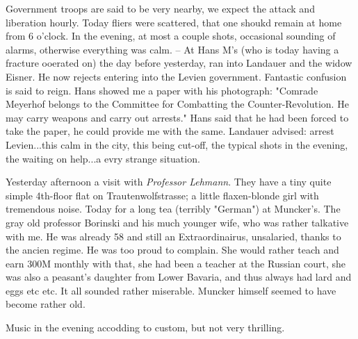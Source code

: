 
Government troops are said to be very nearby, we expect the attack and liberation hourly. Today fliers were scattered, that one shoukd remain at home from 6 o'clock. In the evening, at most a couple shots, occasional sounding of alarms, otherwise everything was calm. -- At Hans M's (who is today having a fracture ooerated on) the day before yesterday, ran into Landauer and the widow Eisner. He now rejects entering into the Levien government. Fantastic confusion is said to reign. Hans showed me a paper with his photograph: "Comrade Meyerhof belongs to the Committee for Combatting the Counter-Revolution. He may carry weapons and carry out arrests." Hans said that he had been forced to take the paper, he could provide me with the same. Landauer advised: arrest Levien...this calm in the city, this being cut-off, the typical shots in the evening, the waiting on help...a evry strange situation.

\missing

Yesterday afternoon a visit with \textit{Professor Lehmann}. They have a tiny quite simple 4th-floor flat on Trautenwolfstrasse; a little flaxen-blonde girl  with tremendous noise. Today for a long tea (terribly "German") at Muncker's. The gray old professor Borinski and his much younger wife, who was rather talkative with me. He was already 58 and still an Extraordinairus, unsalaried, thanks to the ancien regime. He was too proud to complain. She would rather teach and earn 300M monthly with that, she had been a teacher at the Russian court, she was also a peasant's daughter from Lower Bavaria, and thus always had lard and eggs etc etc. It all sounded rather miserable. Muncker himself seemed to have become rather old.

Music in the evening accodding to custom, but not very thrilling.

% 